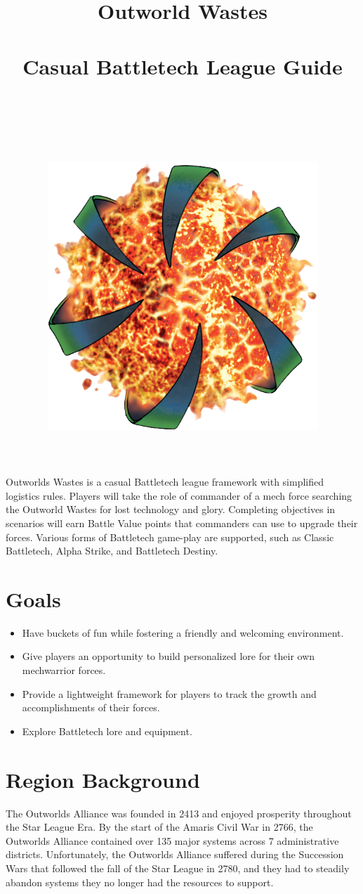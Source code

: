\documentclass[UTF8]{article}
\title{
  Outworld Wastes\\
  ~\\
  \large Casual Battletech League Guide \\
  ~\\
  ~\\
  ~\\
  \includegraphics[width=4in]{img/Outworlds_Alliance.png}
}
\author{}
\date{}
\begin{document}
\maketitle

\newpage

Outworlds Wastes is a casual Battletech league framework with simplified logistics rules.
Players will take the role of commander of a mech force searching the Outworld Wastes for lost technology and glory.
Completing objectives in scenarios will earn Battle Value points that commanders can use to upgrade their forces.
Various forms of Battletech game-play are supported, such as Classic Battletech, Alpha Strike, and Battletech Destiny.\\

\section*{Goals}

\begin{itemize}

\item Have buckets of fun while fostering a friendly and welcoming environment.

\item Give players an opportunity to build personalized lore for their own mechwarrior forces.

\item Provide a lightweight framework for players to track the growth and accomplishments of their forces.

\item Explore Battletech lore and equipment.

\end{itemize}

\newpage

\section{Region Background}

The Outworlds Alliance was founded in 2413 and enjoyed prosperity throughout the Star League Era.
By the start of the Amaris Civil War in 2766, the Outworlds Alliance contained over 135 major systems across 7 administrative districts.
Unfortunately, the Outworlds Alliance suffered during the Succession Wars that followed the fall of the Star League in 2780, and they had to steadily abandon systems they no longer had the resources to support.\\
\end{document}
